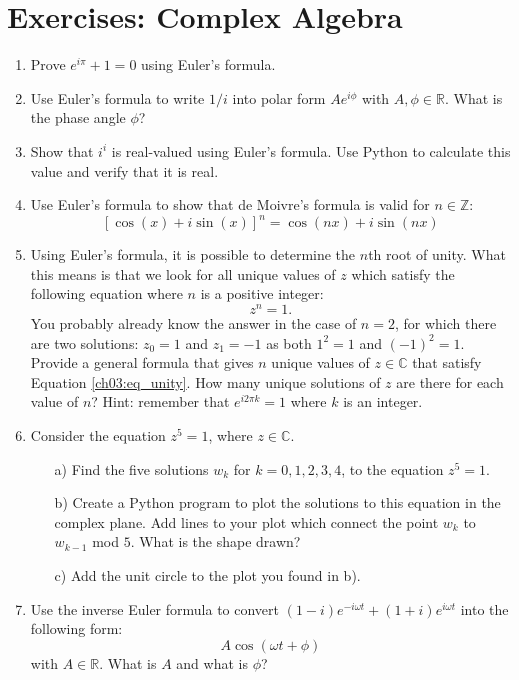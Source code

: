 \newpage
\section{Exercises: Complex Algebra}

\begin{enumerate}
\item Prove $e^{i\pi}+1=0$ using Euler's formula. 
\item Use Euler's formula to write $1/i$ into polar form $Ae^{i\phi}$ with $A,\phi\in\mathbb{R}$. What is the phase angle $\phi$?
\item Show that $i^{i}$ is real-valued using Euler's formula. Use Python to calculate this value and verify that it is real. 
\item Use Euler's formula to show that de Moivre's formula is valid for $n\in\mathbb{Z}$:
$$[\cos(x)+i\sin(x)]^{n}=\cos(nx)+i\sin(nx)$$

\item Using Euler's formula, it is possible to determine the $n$th root of unity. What this means is that we look for all unique values of $z$ which satisfy the following equation where $n$ is a positive integer:
\begin{equation}
    z^{n}=1.
    \label{ch03:eq_unity}
\end{equation}
You probably already know the answer in the case of $n=2$, for which there are two solutions: $z_{0}=1$ and $z_{1}=-1$ as both $1^{2}=1$ and $(-1)^{2}=1$. \\
Provide a general formula that gives $n$ unique values of $z\in\mathbb{C}$ that
satisfy Equation \ref{ch03:eq_unity}. How many unique solutions of $z$ are there
for each value of $n$? Hint: remember that $e^{i 2\pi k} = 1$ where
$k$ is an integer. 
\item Consider the equation $z^{5}=1$, where $z\in\mathbb{C}$. 
\begin{itemize}
    \item[a)] Find the five solutions $w_{k}$ for $k=0,1,2,3,4$, to the equation $z^{5}=1$. 
    \item[b)] Create a Python program to plot the solutions to this equation in the complex plane. Add lines to your plot which connect the point $w_{k}$ to $w_{k-1}$ mod $5$. What is the shape drawn?
    \item[c)] Add the unit circle to the plot you found in b). 
\end{itemize}

\item Use the inverse Euler formula to convert $(1-i) e^{-i \omega t} + (1+i) e^{i
  \omega t}$ into the following form:
\begin{equation*}
    A \cos(\omega t  + \phi)
\end{equation*}
with $A\in \mathbb{R}$. What is $A$ and what is $\phi$?


\end{enumerate}
